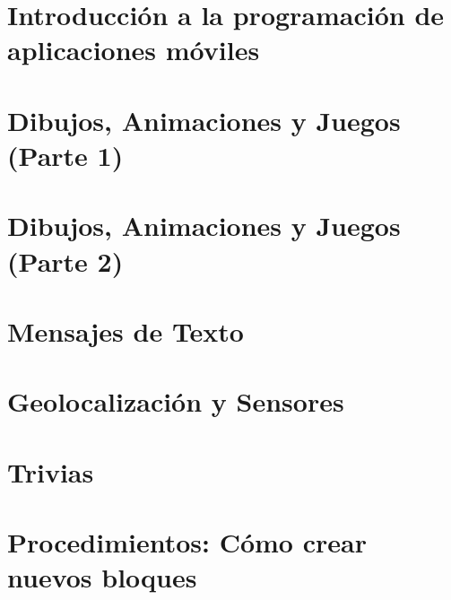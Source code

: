 \documentclass[letterpaper,12pt]{book}
\begin{document}

\tableofcontents %
\listoffigures   %
\cleardoublepage
\listoftables    %
\cleardoublepage

\setcounter{page}{1} %

\newpage
\chapter{Introducción a la programación de aplicaciones móviles}

\newpage
\chapter{Dibujos, Animaciones y Juegos (Parte 1)}

\newpage
\chapter{Dibujos, Animaciones y Juegos (Parte 2)}

\newpage
\chapter{Mensajes de Texto}

\newpage
\chapter{Geolocalización y Sensores}

\newpage
\chapter{Trivias}

\newpage
\chapter{Procedimientos: Cómo crear nuevos bloques}


%
\end{document}
